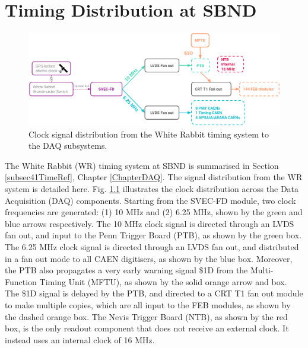 
\chapter{Timing Distribution at SBND} 
\label{appendix_timing_dist}
\ifpdf
    \graphicspath{{Appendix3/Figs/Raster/}{Appendix3/Figs/PDF/}{Appendix3/Figs/}}
\else
    \graphicspath{{Appendix3/Figs/Vector/}{Appendix3/Figs/}}
\fi


\begin{figure}[b!] 
\centering    
\includegraphics[width=1.0\textwidth]{clock_dist}
\caption[Clock Signal Distribution]{
Clock signal distribution from the White Rabbit timing system to the DAQ subsystems. 
}
\label{fig:clock_dist}
\end{figure}

The White Rabbit (WR) timing system at SBND is summarised in Section \ref{subsec41TimeRef}, Chapter \ref{ChapterDAQ}.
The signal distribution from the WR system is detailed here.                                                                                                           
Fig. \ref{fig:clock_dist} illustrates the clock distribution across the Data Acquisition (DAQ) components.                                                                                
Starting from the SVEC-FD module, two clock frequencies are generated: (1) 10 MHz and (2) 6.25 MHz, shown by the green and blue arrows respectively.
The 10 MHz clock signal is directed through an LVDS fan out, and input to the Penn Trigger Board (PTB), as shown by the green box.
The 6.25 MHz clock signal is directed through an LVDS fan out, and distributed in a fan out mode to all CAEN digitisers, as shown by the blue box.                      
Moreover, the PTB also propagates a very early warning signal \$1D from the Multi-Function Timing Unit (MFTU), as shown by the solid orange arrow and box.                  
The \$1D signal is delayed by the PTB, and directed to a CRT T1 fan out module to make multiple copies, which are all input to the FEB modules, as shown by the dashed orange box.                                                                                                                                                             
The Nevis Trigger Board (NTB), as shown by the red box, is the only readout component that does not receive an external clock.                                         
It instead uses an internal clock of 16 MHz.                                                                                                                           

